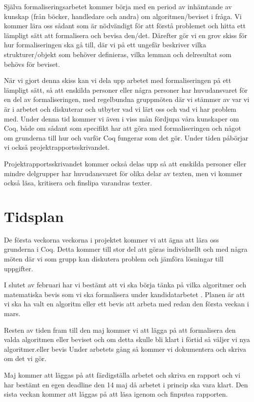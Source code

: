 \documentclass[a4paper]{article}
\begin{document}
Själva formaliseringsarbetet kommer börja med en period av inhämtande av
kunskap (från böcker, handledare och andra) om algoritmen/beviset i fråga. Vi
kommer lära oss sådant som är nödvändigt för att förstå problemet och hitta ett
lämpligt sätt att formalisera och bevisa den/det. Därefter gör vi en grov skiss
för hur formaliseringen ska gå till, där vi på ett ungefär beskriver vilka
strukturer/objekt som behöver definieras, vilka lemman och delresultat som
behövs för beviset.

När vi gjort denna skiss kan vi dela upp arbetet med formaliseringen på ett
lämpligt sätt, så att enskilda personer eller några personer har huvudansvaret
för en del av formaliseringen, med regelbundna gruppmöten där vi stämmer av var
vi är i arbetet och diskuterar och utbyter vad vi lärt oss och vad vi har
problem med. Under denna tid kommer vi även i viss mån fördjupa våra kunskaper
om Coq, både om sådant som specifikt har att göra med formaliseringen och något
om grunderna till hur och varför Coq fungerar som det gör. Under tiden påbörjar
vi också projektrapportsskrivandet.

Projektrapportsskrivandet kommer också delas upp så att enskilda personer eller
mindre delgrupper har huvudansvaret för olika delar av texten, men vi kommer
också läsa, kritisera och finslipa varandras texter.

\section*{Tidsplan}

De första veckorna veckorna i projektet kommer vi att ägna att lära oss
grunderna i Coq. Detta kommer till stor del att göras individuellt och med
några möten där vi som grupp kan diskutera problem och jämföra lösningar till
uppgifter.

I slutet av februari har vi bestämt att vi ska börja tänka på vilka algoritmer
och matematiska bevis som vi ska formalisera under kandidatarbetet . Planen är
att vi ska ha valt en algoritm eller ett bevis att arbeta med redan den första
veckan i mars.

Resten av tiden fram till den maj kommer vi att lägga på att formalisera den
valda algoritmen eller beviset och om detta skulle bli klart i förtid så väljer
vi nya algoritmer.eller bevis  Under arbetets gång så kommer vi  dokumentera
och skriva om det vi gör.

Maj kommer att läggas på att färdigställa arbetet och skriva en rapport och vi
har bestämt en egen deadline den 14 maj då arbetet i princip ska vara klart.
Den sista veckan kommer att läggas på att läsa igenom och finputsa rapporten.
\end{document}
